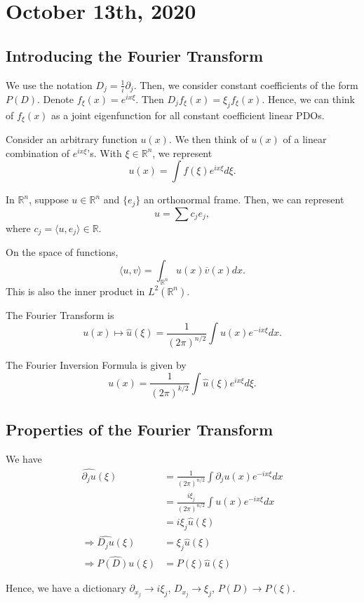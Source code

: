 \documentclass[11pt]{scrartcl}
\newcommand{\R}{\mathbb{R}}
\renewcommand{\hat}{\widehat}
\begin{document}
\section{October 13th, 2020}
\subsection{Introducing the Fourier Transform}
We use the notation $D_j = \frac{1}{i}\partial_j$.  Then, we consider constant coefficients of the form $P(D)$.  Denote $f_{\xi}(x) = e^{ix \xi}$.  Then $D_j f_\xi(x) = \xi_j f_\xi(x)$.  Hence, we can think of $f_{\xi}(x)$ as a joint eigenfunction for all constant coefficient linear PDOs.

Consider an arbitrary function $u(x)$.  We then think of $u(x)$ of a linear combination of $e^{ix\xi}$'s.  With $\xi \in \R^n$, we represent 
$$u(x) = \int f(\xi)e^{ix\xi}d\xi.$$

In $\R^n$, suppose $u \in \R^n$ and $\{e_j\}$ an orthonormal frame.  Then, we can represent $$u = \sum c_je_j,$$
where $c_j = \langle u, e_j\rangle \in \R$.

On the space of functions, 
$$\langle u, v \rangle = \int_{\R^n} u(x) \overline{v}(x)dx.$$
This is also the inner product in $L^2(\R^n).$

\begin{definition} The Fourier Transform is $$u(x) \mapsto \hat{u}(\xi) = \frac{1}{(2\pi)^{n/2}}\int u(x) e^{-ix \xi}dx.$$  

The Fourier Inversion Formula is given by 
$$u(x) = \frac{1}{(2\pi)^{k/2}} \int \hat{u}(\xi)e^{ix \xi}d\xi.$$
\end{definition}

\subsection{Properties of the Fourier Transform}
We have 
\begin{align*}
\hat{\partial_j u}(\xi) &= \frac{1}{(2\pi)^{n/2}}\int \partial_j u(x)e^{-ix\xi}dx \\
&= \frac{i\xi_j}{(2\pi)^{n/2}}\int u(x)e^{-ix\xi} dx \\
&= i\xi_j\hat{u}(\xi) \\
\Rightarrow \hat{D_j u}(\xi) &=  \xi_j \hat{u}(\xi)\\
\Rightarrow \hat{P(D)u}(\xi) &= P(\xi)\hat{u}(\xi)
\end{align*}

Hence, we have a dictionary $\partial_{x_j} \rightarrow i\xi_j$, $D_{x_j} \to \xi_j$, $P(D) \to P(\xi)$.
\end{document}
